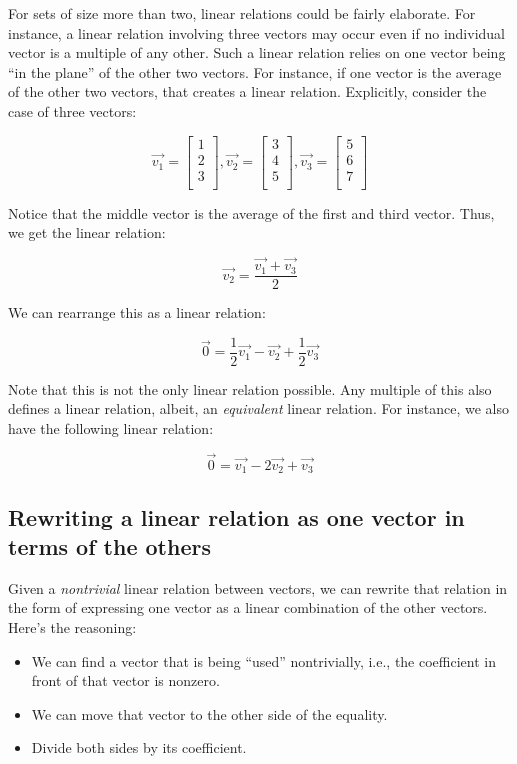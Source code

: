 \documentclass[10pt]{amsart}
\begin{document}
For sets of size more than two, linear relations could be fairly
elaborate. For instance, a linear relation involving three vectors may
occur even if no individual vector is a multiple of any other. Such a
linear relation relies on one vector being ``in the plane'' of the
other two vectors. For instance, if one vector is the average of the
other two vectors, that creates a linear relation. Explicitly,
consider the case of three vectors:

$$\vec{v_1} = \left[\begin{matrix} 1 \\ 2 \\ 3 \\\end{matrix}\right], \vec{v_2} = \left[\begin{matrix} 3 \\ 4 \\ 5 \\\end{matrix}\right], \vec{v_3} = \left[ \begin{matrix} 5 \\ 6 \\ 7 \\\end{matrix}\right]$$

Notice that the middle vector is the average of the first and third
vector. Thus, we get the linear relation:

$$\vec{v_2} = \frac{\vec{v_1} + \vec{v_3}}{2}$$

We can rearrange this as a linear relation:

$$\vec{0} = \frac{1}{2}\vec{v_1} - \vec{v_2} + \frac{1}{2}\vec{v_3}$$

Note that this is not the only linear relation possible. Any multiple
of this also defines a linear relation, albeit, an {\em equivalent}
linear relation. For instance, we also have the following linear
relation:

$$\vec{0} = \vec{v_1} - 2\vec{v_2} + \vec{v_3}$$
\subsection{Rewriting a linear relation as one vector in terms of the others}

Given a {\em nontrivial} linear relation between vectors, we can
rewrite that relation in the form of expressing one vector as a linear
combination of the other vectors. Here's the reasoning:

\begin{itemize}
\item We can find a vector that is being ``used'' nontrivially, i.e.,
  the coefficient in front of that vector is nonzero.
\item We can move that vector to the other side of the equality.
\item Divide both sides by its coefficient.
\end{itemize}
\end{document}
